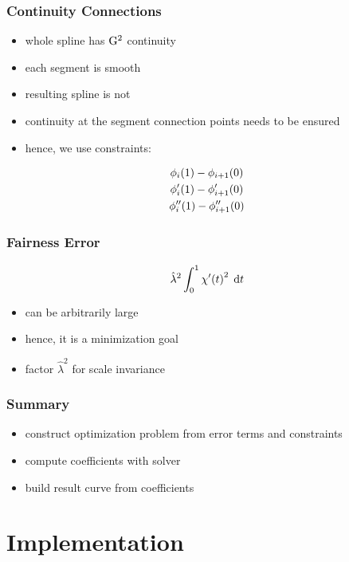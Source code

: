 \documentclass[mathserif]{beamer}
\begin{document}
		\begin{frame}
			\frametitle{Continuity Connections}
			\begin{itemize}
				\item whole spline has \(\mathrm{G}^{2}\) continuity
				\item each segment is smooth
				\item resulting spline is not
				\item continuity at the segment connection points needs to be ensured
				\item hence, we use constraints:
			\end{itemize}
			\begin{equation*}
				\begin{gathered}
					\phi_i\!\left( 1 \right) - \phi_{i + 1}\!\left( 0 \right)\\
					\phi'_i\!\left( 1 \right) - \phi'_{i + 1}\!\left( 0 \right)\\
					\phi''_i\!\left( 1 \right) - \phi''_{i + 1}\!\left( 0 \right)
				\end{gathered}
			\end{equation*}
		\end{frame}
		
		\begin{frame}
			\frametitle{Fairness Error}
			\begin{equation*}
				\hat{\lambda}^2\int_{0}^{1} \chi'\!\left( t \right)^2 \; \mathrm{d}t
			\end{equation*}
			\begin{itemize}
				\item can be arbitrarily large
				\item hence, it is a minimization goal
				\item factor \(\hat{\lambda}^2\) for scale invariance
			\end{itemize}
		\end{frame}
		
		\begin{frame}
			\frametitle{Summary}
			\begin{itemize}
				\item construct optimization problem from error terms and constraints
				\item compute coefficients with solver
				\item build result curve from coefficients
			\end{itemize}
		\end{frame}
		
	\section{Implementation}
	
\end{document}
